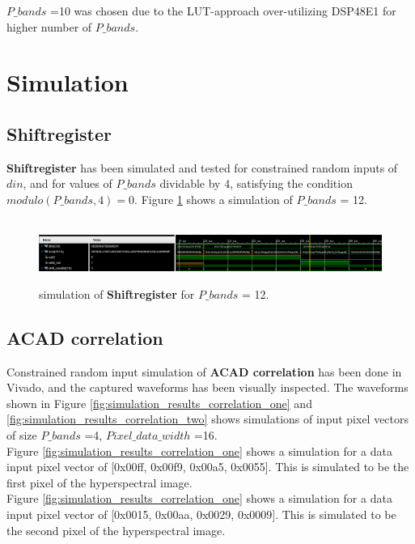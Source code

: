 $P\_bands$ =10 was chosen due to the LUT-approach over-utilizing DSP48E1 for higher number of $P\_bands$. 
 
 
 \section{Simulation}
\subsection{Shiftregister}
\textbf{Shiftregister} has been simulated and tested for constrained random inputs of $din$, and for values of $P\_bands$ dividable by 4, satisfying the condition $modulo(P\_bands,4)=0$. Figure \ref{fig:simulation_shiftregister} shows a simulation of $P\_bands$ = 12. 


\begin{figure}[H]

\hbox{\hspace*{-2.3cm}                                                           
   \includegraphics[scale=0.45]{images/simulation_results/shiftregister_p_bands_12.PNG}}
  \caption{simulation of \textbf{Shiftregister} for $P\_bands$ = 12. } 
  \label{fig:simulation_shiftregister}
\end{figure}
 
 \subsection{ACAD correlation}

 Constrained random input simulation of \textbf{ACAD correlation} has been done in Vivado, and the captured waveforms has been visually inspected. The waveforms shown in Figure \ref{fig:simulation_results_correlation_one} and \ref{fig:simulation_results_correlation_two} shows simulations of input pixel vectors of size $P\_bands$ =4, $Pixel\_data\_width$ =16.\\
 
 Figure \ref{fig:simulation_results_correlation_one} shows a simulation for a data input pixel vector of [0x00ff, 0x00f9, 0x00a5, 0x0055]. This is simulated to be the first pixel of the hyperspectral image.\\
 
 Figure \ref{fig:simulation_results_correlation_one} shows a simulation for a data input pixel vector of [0x0015, 0x00aa, 0x0029, 0x0009]. This is simulated to be the second pixel of the hyperspectral image.
 
